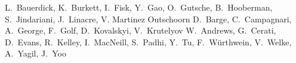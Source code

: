 \begin{Authlist}
%
L.~Bauerdick, K.~Burkett, I.~Fisk, Y.~Gao, O.~Gutsche, B.~Hooberman, S.~Jindariani,  J.~Linacre, V. Martinez Outschoorn
%
D.~Barge, C.~Campagnari, A.~George, F.~Golf, D.~Kovalskyi, V.~Krutelyov
%
W.~Andrews, G.~Cerati, D.~Evans, R.~Kelley, I.~MacNeill, S.~Padhi, Y.~Tu, F.~W\"urthwein, V.~Welke, A.~Yagil, J.~Yoo

\end{Authlist}
